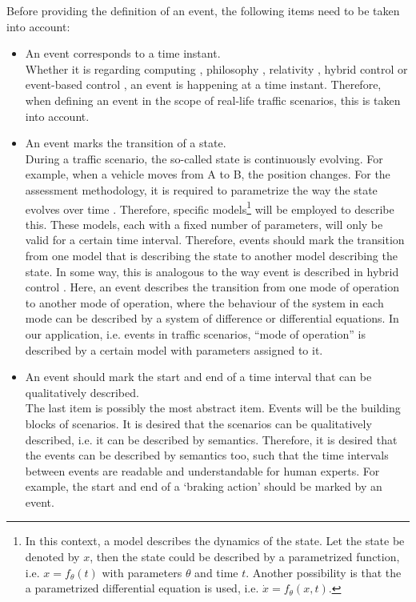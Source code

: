 \documentclass[10pt,final,a4paper,oneside,onecolumn]{article}
\begin{document}
Before providing the definition of an event, the following items need to be taken into account:
\begin{itemize}
	\item An event corresponds to a time instant.\\
	Whether it is regarding computing \cite{breu1997towards}, philosophy \cite{kim1993supervenience}, relativity \cite{sartori1996understanding}, hybrid control \cite{branicky1998hybridcontrol,deschutter2003hybrid} or event-based control \cite{heemels2012eventcontrol}, an event is happening at a time instant. Therefore, when defining an event in the scope of real-life traffic scenarios, this is taken into account.
	
	\item An event marks the transition of a state.\\
	During a traffic scenario, the so-called state is continuously evolving. For example, when a vehicle moves from A to B, the position changes. For the assessment methodology, it is required to parametrize the way the state evolves over time \cite{deGelder2017assessment}. Therefore, specific models\footnote{\label{note:model}In this context, a model describes the dynamics of the state. Let the state be denoted by $x$, then the state could be described by a parametrized function, i.e. $x = f_{\theta}(t)$ with parameters $\theta$ and time $t$. Another possibility is that the a parametrized differential equation is used, i.e. $\dot{x} = f_{\theta}(x, t)$.} will be employed to describe this. These models, each with a fixed number of parameters, will only be valid for a certain time interval. Therefore, events should mark the transition from one model that is describing the state to another model describing the state. In some way, this is analogous to the way event is described in hybrid control \cite{deschutter2003hybrid}. Here, an event describes the transition from one mode of operation to another mode of operation, where the behaviour of the system in each mode can be described by a system of difference or differential equations. In our application, i.e. events in traffic scenarios, ``mode of operation'' is described by a certain model with parameters assigned to it.
	
	\item An event should mark the start and end of a time interval that can be qualitatively described.\\
	The last item is possibly the most abstract item. Events will be the building blocks of scenarios. It is desired that the scenarios can be qualitatively described, i.e. it can be described by semantics. Therefore, it is desired that the events can be described by semantics too, such that the time intervals between events are readable and understandable for human experts. For example, the start and end of a `braking action' should be marked by an event. 
\end{itemize}
\end{document}
